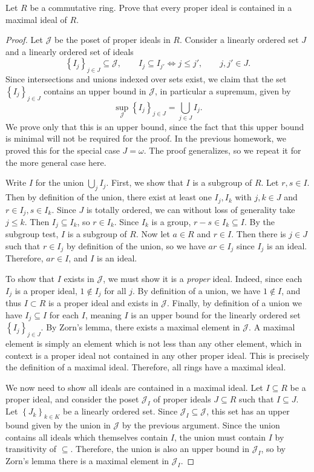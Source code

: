 \documentclass[11pt, letterpaper]{article}
\begin{document}
\begin{problem}\label{5}
	Let $R$ be a commutative ring. Prove that every proper ideal is contained in a maximal ideal of $R$.
\end{problem}
\begin{proof}
	Let $\mathcal{J} $ be the poset of proper ideals in $R$. Consider a linearly ordered set $J$ and a linearly ordered set of ideals
	\[
		\left\{ I_j \right\}_{j\in J}\subseteq \mathcal{J} ,\qquad I_j \subseteq I_{j'} \iff j \leq j',\qquad j,j'\in J
	.\]
	Since intersections and unions indexed over sets exist, we claim that the set $\left\{ I_j \right\} _{j\in J} $ contains an upper bound in $\mathcal{J} $, in particular a supremum, given by
	\[
		\sup_{\mathcal{J} } \left\{ I_j \right\} _{j\in J} =\bigcup_{j\in J} I_j
	.\]
	We prove only that this is an upper bound, since the fact that this upper bound is minimal will not be required for the proof. In the previous homework, we proved this for the special case $J=\omega $. The proof generalizes, so we repeat it for the more general case here.

	Write $I$ for the union $\bigcup_{j} I_j$. First, we show that $I$ is a subgroup of $R$. Let $r,s\in I$. Then by definition of the union, there exist at least one $I_j,I_k$ with $j,k\in J$ and $r\in I_j,s\in I_k$. Since $J$ is totally ordered, we can without loss of generality take $j\leq k$. Then $I_j \subseteq I_k$, so $r\in I_k$. Since $I_k$ is a group, $r-s\in I_k\subseteq I$. By the subgroup test, $I$ is a subgroup of $R$. Now let $a\in R$ and $r\in I$. Then there is $j\in J$ such that $r\in I_j$ by definition of the union, so we have $ar\in I_j$ since $I_j$ is an ideal. Therefore, $ar\in I$, and $I$ is an ideal.

	To show that $I$ exists in $\mathcal{J} $, we must show it is a \emph{proper} ideal. Indeed, since each $I_j$ is a proper ideal, $1\notin I_j$ for all $j$. By definition of a union, we have $1\notin I$, and thus $I \subset R$ is a proper ideal and exists in $\mathcal{J} $. Finally, by definition of a union we have $I_j \subseteq I$ for each $I$, meaning $I$ is an upper bound for the linearly ordered set $\left\{ I_j \right\} _{j\in J} $. By Zorn's lemma, there exists a maximal element in $\mathcal{J} $. A maximal element is simply an element which is not less than any other element, which in context is a proper ideal not contained in any other proper ideal. This is precisely the definition of a maximal ideal. Therefore, all rings have a maximal ideal.

	We now need to show all ideals are contained in a maximal ideal. Let $I\subseteq R$ be a proper ideal, and consider the poset $\mathcal{J} _I$  of proper ideals $J\subseteq R$ such that $I\subseteq J$. Let $\left\{ J_k \right\}_{k\in K} $ be a linearly ordered set. Since $\mathcal{J} _I \subseteq \mathcal{J} $, this set has an upper bound given by the union in $\mathcal{J} $ by the previous argument. Since the union contains all ideals which themselves contain $I$, the union must contain $I$ by transitivity of $\subseteq $. Therefore, the union is also an upper bound in $\mathcal{J} _I$, so by Zorn's lemma there is a maximal element in $\mathcal{J} _I$.


\end{proof}
\end{document}
